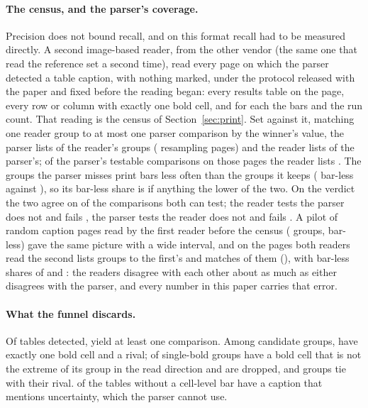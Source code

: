 \documentclass[sigconf,anonymous]{aamas}
\begin{document}
\paragraph{The census, and the parser's coverage.} Precision does not
bound recall, and on this format recall had to be measured directly. A
second image-based reader, from the other vendor (the same one that read the
reference set a second time), read every page on which the parser detected a
table caption, with nothing marked, under the protocol released with the
paper and fixed before the reading began: every results table on the page,
every row or column with exactly one bold cell, and for each the bars and
the run count. That reading is the census of Section~\ref{sec:print}. Set
against it, matching one reader group to at most one parser comparison by
the winner's value, the parser lists \nCzReaderFoundPct{} of the reader's
groups (\nCzReaderFoundPageCi{} resampling pages) and the reader lists
\nCzPipeFoundPct{} of the parser's; of the parser's testable comparisons on
those pages the reader lists \nCzPipeTestableFound{}. The groups the parser
misses print bars less often than the groups it keeps
(\nCzUnmatchedNeither{} bar-less against \nCzMatchedNeither{}), so its
bar-less share is if anything the lower of the two. On the verdict the two
agree on \nCzSharedAgree{} of the \nCzShared{} comparisons both can test;
the reader tests \nCzReaderOnlyN{} the parser does not and fails
\nCzReaderOnlyFails{}, the parser tests \nCzPipeOnlyN{} the reader does not
and fails \nCzPipeOnlyFails{}. A pilot of \nPagesRead{} random caption
pages read by the first reader before the census (\nPagesReaderGroups{}
groups, \nPagesReaderNeither{} bar-less) gave the same picture with a wide
interval, and on the \nCcrPages{} pages both readers read the second lists
\nCcrSecondGroups{} groups to the first's \nCcrFirstGroups{} and matches
\nCcrMatched{} of them (\nCcrMatchedPct{}), with bar-less shares of
\nCcrSecondNeither{} and \nCcrFirstNeither{}: the readers disagree with
each other about as much as either disagrees with the parser, and every
number in this paper carries that error.

\paragraph{What the funnel discards.} Of \nATablesDetected{} tables
detected, \nATablesYielding{} yield at least one comparison. Among
\nAGroupsCandidate{} candidate groups, \nAGroupsUsablePct{} have exactly one
bold cell and a rival; \nABoldNotExtremalPct{} of single-bold groups have a
bold cell that is not the extreme of its group in the read direction and are
dropped, and \nABoldTied{} groups tie with their rival.
\nAEmptyTablesCaptionUncertainty{} of the \nAEmptyTables{} tables without a
cell-level bar have a caption that mentions uncertainty, which the parser
cannot use.
\end{document}
